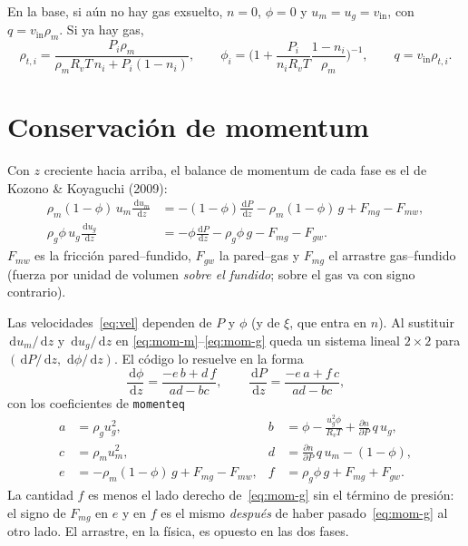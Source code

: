 \documentclass[11pt,a4paper]{article}
\newcommand{\dd}{\,\mathrm{d}}
\newcommand{\p}{\partial}
\newcommand{\Rv}{R_v}
\begin{document}
En la base, si aún no hay gas exsuelto, $n=0$, $\phi=0$ y
$u_m=u_g=v_{\mathrm{in}}$, con $q=v_{\mathrm{in}}\rho_m$. Si ya hay
gas,
\begin{equation}
\rho_{t,i}
=\frac{P_i\rho_m}{\rho_m \Rv T\,n_i+P_i(1-n_i)},
\qquad
\phi_i
=\Biggl(1+\frac{P_i}{n_i\Rv T}\frac{1-n_i}{\rho_m}\Biggr)^{-1},
\qquad
q=v_{\mathrm{in}}\rho_{t,i}.
\end{equation}

\section{Conservación de momentum}
\label{sec:mom}

Con $z$ creciente hacia arriba, el balance de momentum de cada fase
es el de Kozono \& Koyaguchi (2009):
\begin{align}
\rho_m(1-\phi)\,u_m\frac{\dd u_m}{\dd z}
&=-(1-\phi)\frac{\dd P}{\dd z}
-\rho_m(1-\phi)\,g
+F_{mg}-F_{mw},
\label{eq:mom-m}\\[0.3em]
\rho_g\phi\,u_g\frac{\dd u_g}{\dd z}
&=-\phi\frac{\dd P}{\dd z}
-\rho_g\phi\,g
-F_{mg}-F_{gw}.
\label{eq:mom-g}
\end{align}
$F_{mw}$ es la fricción pared--fundido, $F_{gw}$ la pared--gas y
$F_{mg}$ el arrastre gas--fundido (fuerza por unidad de volumen
\emph{sobre el fundido}; sobre el gas va con signo contrario).

Las velocidades~\eqref{eq:vel} dependen de $P$ y $\phi$ (y de $\xi$,
que entra en $n$). Al sustituir $\dd u_m/\dd z$ y $\dd u_g/\dd z$ en
\eqref{eq:mom-m}--\eqref{eq:mom-g} queda un sistema lineal $2\times2$
para $(\dd P/\dd z,\,\dd\phi/\dd z)$. El código lo resuelve en la
forma
\begin{equation}
\label{eq:22}
\frac{\dd\phi}{\dd z}
=\frac{-e\,b+d\,f}{ad-bc},
\qquad
\frac{\dd P}{\dd z}
=\frac{-e\,a+f\,c}{ad-bc},
\end{equation}
con los coeficientes de \texttt{momenteq}
\begin{align}
a&=\rho_g u_g^2, &
b&=\phi-\frac{u_g^2\phi}{\Rv T}+\frac{\p n}{\p P}\,q\,u_g,
\label{eq:coef}\\
c&=\rho_m u_m^2, &
d&=\frac{\p n}{\p P}\,q\,u_m-(1-\phi),\nonumber\\
e&=-\rho_m(1-\phi)\,g+F_{mg}-F_{mw}, &
f&=\rho_g\phi\,g+F_{mg}+F_{gw}.\nonumber
\end{align}
La cantidad $f$ es menos el lado derecho de~\eqref{eq:mom-g} sin el
término de presión: el signo de $F_{mg}$ en $e$ y en $f$ es el mismo
\emph{después} de haber pasado~\eqref{eq:mom-g} al otro lado. El
arrastre, en la física, es opuesto en las dos fases.
\end{document}
